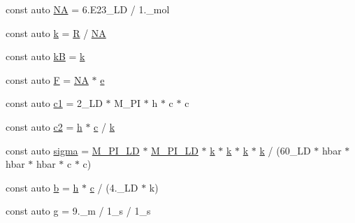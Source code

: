 \begin{DoxyCompactItemize}
\item 
const auto \hyperlink{namespaceboost_1_1units_1_1constants_a7f9d392dceaa7bbe31525aa275c6489d}{NA} = 6.\+E23\+\_\+\+L\+D / 1.\+\_\+mol
\item 
const auto \hyperlink{namespaceboost_1_1units_1_1constants_aaa1646309f48431cdde13c0c78b18b44}{k} = \hyperlink{namespaceboost_1_1units_1_1constants_a2d0c094390643c2ba3ac40a3ebdd9dd5}{R} / \hyperlink{namespaceboost_1_1units_1_1constants_a7f9d392dceaa7bbe31525aa275c6489d}{NA}
\item 
const auto \hyperlink{namespaceboost_1_1units_1_1constants_a3efaeb6808b8fbf551acf79d78c2557d}{kB} = \hyperlink{namespaceboost_1_1units_1_1constants_aaa1646309f48431cdde13c0c78b18b44}{k}
\item 
const auto \hyperlink{namespaceboost_1_1units_1_1constants_ad4a323c9b82ddc3904d2132c326ebaae}{F} = \hyperlink{namespaceboost_1_1units_1_1constants_a7f9d392dceaa7bbe31525aa275c6489d}{NA} $\ast$ \hyperlink{namespaceboost_1_1units_1_1constants_a0e10024b337b34c7f7300c67f0e9fcb1}{e}
\item 
const auto \hyperlink{namespaceboost_1_1units_1_1constants_a77173e14008b7c3de3353a905112a18c}{c1} = 2\+\_\+\+L\+D $\ast$ M\+\_\+\+P\+I $\ast$ h $\ast$ c $\ast$ c
\item 
const auto \hyperlink{namespaceboost_1_1units_1_1constants_a2937e386d51a9ac493a9ea7131d1a792}{c2} = \hyperlink{namespaceboost_1_1units_1_1constants_a744f5a50efb6701fcbde9527affd7776}{h} $\ast$ \hyperlink{namespaceboost_1_1units_1_1constants_a1e4c07de84b2d43e7717eaada50b32de}{c} / \hyperlink{namespaceboost_1_1units_1_1constants_aaa1646309f48431cdde13c0c78b18b44}{k}
\item 
const auto \hyperlink{namespaceboost_1_1units_1_1constants_af083974ac792b5782a33f287fadffacb}{sigma} = \hyperlink{namespaceboost_1_1units_1_1constants_a14415c6082722a7b15c191a15f513b40}{M\+\_\+\+P\+I\+\_\+\+LD} $\ast$ \hyperlink{namespaceboost_1_1units_1_1constants_a14415c6082722a7b15c191a15f513b40}{M\+\_\+\+P\+I\+\_\+\+LD} $\ast$ \hyperlink{namespaceboost_1_1units_1_1constants_aaa1646309f48431cdde13c0c78b18b44}{k} $\ast$ \hyperlink{namespaceboost_1_1units_1_1constants_aaa1646309f48431cdde13c0c78b18b44}{k} $\ast$ \hyperlink{namespaceboost_1_1units_1_1constants_aaa1646309f48431cdde13c0c78b18b44}{k} $\ast$ \hyperlink{namespaceboost_1_1units_1_1constants_aaa1646309f48431cdde13c0c78b18b44}{k} / (60\+\_\+\+L\+D $\ast$ hbar $\ast$ hbar $\ast$ hbar $\ast$ c $\ast$ c)
\item 
const auto \hyperlink{namespaceboost_1_1units_1_1constants_a573524689deff9e05d853350304e9635}{b} = \hyperlink{namespaceboost_1_1units_1_1constants_a744f5a50efb6701fcbde9527affd7776}{h} $\ast$ \hyperlink{namespaceboost_1_1units_1_1constants_a1e4c07de84b2d43e7717eaada50b32de}{c} / (4.\+\_\+\+L\+D $\ast$ k)
\item 
const auto \hyperlink{namespaceboost_1_1units_1_1constants_a1c1bcbea7888f1bed4431f0ec45b57f5}{g} = 9.\+\_\+m / 1\+\_\+s / 1\+\_\+s
\end{DoxyCompactItemize}



